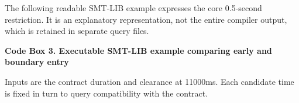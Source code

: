 \documentclass[11pt,a4paper]{article}
\begin{document}
The following readable SMT-LIB example expresses the core 0.5-second restriction. It is an explanatory representation, not the entire compiler output, which is retained in separate query files.\par

\par\medskip\noindent\begin{minipage}{\linewidth}
\textbf{Code Box 3. Executable SMT-LIB example comparing early and boundary entry}\par

Inputs are the contract duration and clearance at 11000ms. Each candidate time is fixed in turn to query compatibility with the contract.\par

\par\medskip\noindent{}
\end{minipage}
\end{document}
